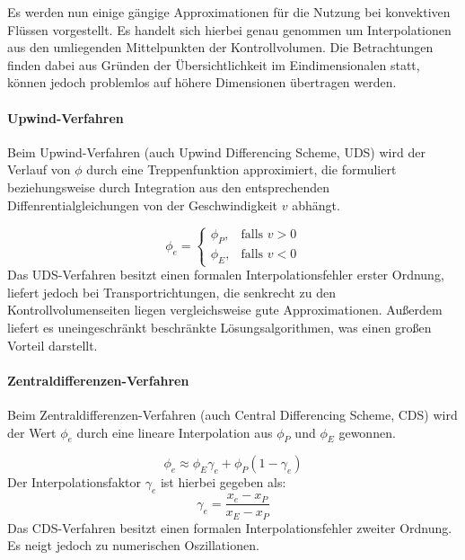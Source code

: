 Es werden nun einige gängige Approximationen für die Nutzung bei konvektiven Flüssen vorgestellt.
Es handelt sich hierbei genau genommen um Interpolationen aus den umliegenden Mittelpunkten der Kontrollvolumen.
Die Betrachtungen finden dabei aus Gründen der Übersichtlichkeit im Eindimensionalen statt,
können jedoch problemlos auf höhere Dimensionen übertragen werden.

\paragraph{Upwind-Verfahren}
\noindent Beim Upwind-Verfahren (auch Upwind Differencing Scheme, UDS) wird der Verlauf von $\phi$ durch eine Treppenfunktion approximiert, die formuliert
beziehungsweise durch Integration aus den entsprechenden Diffenrentialgleichungen 
von der Geschwindigkeit $v$ abhängt.

\begin{equation*}
\phi_e=\left\{\begin{array}{cl} \phi_P, & \mbox{falls }v>0\\
\phi_E, & \mbox{falls } v<0\end{array}\right.
\end{equation*}
Das UDS-Verfahren besitzt einen formalen Interpolationsfehler erster Ordnung, liefert jedoch bei
Transport\-richt\-ung\-en, die senkrecht zu den Kontrollvolumenseiten liegen vergleichsweise gute Approximationen.
Außerdem liefert es uneingeschränkt beschränkte Lösungsalgorithmen, was einen großen Vorteil darstellt.




\paragraph{Zentraldifferenzen-Verfahren}
\noindent Beim Zentraldifferenzen-Verfahren (auch Central Differencing Scheme, CDS) wird der
Wert $\phi_e$ durch eine lineare Interpolation aus $\phi_P$ und $\phi_E$ gewonnen.

\begin{equation*}
  \phi_e \approx \phi_E\gamma_e + \phi_P (1-\gamma_e)
\end{equation*}
Der Interpolationsfaktor $\gamma_e$ ist hierbei gegeben als:
\begin{equation}
  \gamma_e = \frac{x_e-x_P}{x_E-x_P}
  \label{eq:cds_faktor}
\end{equation}
Das CDS-Verfahren besitzt einen formalen Interpolationsfehler zweiter Ordnung. Es neigt jedoch zu
numerischen Oszillationen.

